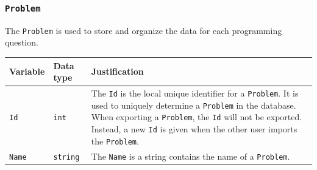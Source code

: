 \documentclass[a4paper]{report}
\begin{document}
\subsubsection{\texttt{Problem}}

The \texttt{Problem} is used to store and organize the data for each programming question.

\begin{tabulary}{\textwidth}{|l|l|L|}
    \hline
    Variable & Data type & Justification \\
    \hline
    \texttt{Id} & \texttt{int} & The \texttt{Id} is the local unique identifier for a \texttt{Problem}. It is used to uniquely determine a \texttt{Problem} in the database. When exporting a \texttt{Problem}, the \texttt{Id} will not be exported. Instead, a new \texttt{Id} is given when the other user imports the \texttt{Problem}. \\
    \hline
    \texttt{Name} & \texttt{string} & The \texttt{Name} is a string contains the name of a \texttt{Problem}. \\
    \hline
\end{tabulary}
\end{document}
